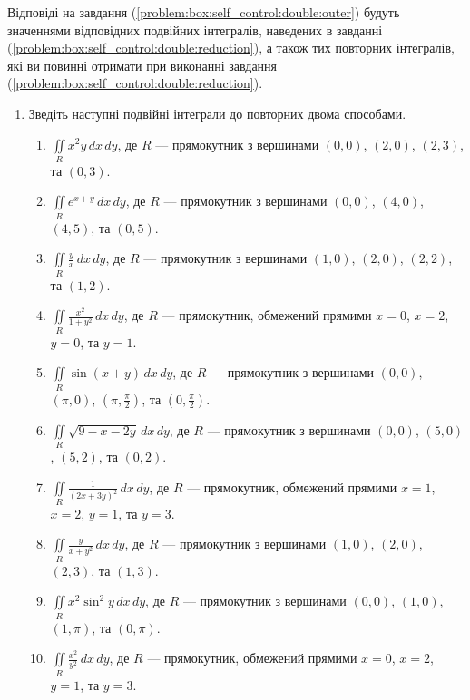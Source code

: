 Відповіді на завдання (\ref{problem:box:self_control:double:outer}) будуть значеннями відповідних подвійних інтегралів, наведених в завданні (\ref{problem:box:self_control:double:reduction}), а також тих повторних інтегралів, які ви повинні отримати при виконанні завдання (\ref{problem:box:self_control:double:reduction}).
\begin{enumerate}
\item\label{problem:box:self_control:double:reduction} Зведіть наступні подвійні інтеграли до повторних двома способами.
    \begin{enumerate}[label*=\arabic*.]
        \item $\iint\limits_R x^2y\,dx\,dy$, де $R$ --- прямокутник з вершинами $(0, 0)$, $(2, 0)$, $(2, 3)$, та $(0, 3)$.
        \item $\iint\limits_R e^{x + y}\,dx\,dy$, де $R$ --- прямокутник з вершинами $(0, 0)$, $(4, 0)$, $(4, 5)$, та $(0, 5)$.
        \item $\iint\limits_R \frac{y}{x}\,dx\,dy$, де $R$ --- прямокутник з вершинами $(1, 0)$, $(2, 0)$, $(2, 2)$, та $(1, 2)$.
        \item $\iint\limits_R \frac{x^2}{1+y^2}\,dx\,dy$, де $R$ --- прямокутник, обмежений прямими $x=0$, $x=2$, $y=0$, та $y=1$.
        \item $\iint\limits_R \sin(x + y)\,dx\,dy$, де $R$ --- прямокутник з вершинами $(0, 0)$, $(\pi, 0)$, $(\pi, \frac{\pi}{2})$, та $(0, \frac{\pi}{2})$.
        \item $\iint\limits_R \sqrt{ 9 -x - 2y}\,dx\,dy$, де $R$ --- прямокутник з вершинами $(0, 0)$, $(5, 0)$, $(5, 2)$, та $(0, 2)$.
        \item $\iint\limits_R \frac{1}{\left( 2 x + 3 y \right)^2}\,dx\,dy$, де $R$ --- прямокутник, обмежений прямими $x=1$, $x=2$, $y=1$, та $y=3$.
        \item $\iint\limits_R \frac{y}{x+y^2}\,dx\,dy$, де $R$ --- прямокутник з вершинами $(1, 0)$, $(2, 0)$, $(2, 3)$, та $(1, 3)$.
        \item $\iint\limits_R x^2\sin^2y\,dx\,dy$, де $R$ --- прямокутник з вершинами $(0, 0)$, $(1, 0)$, $(1, \pi)$, та $(0, \pi)$.
        \item $\iint\limits_R \frac{x^2}{y^2}\,dx\,dy$, де $R$ --- прямокутник, обмежений прямими $x=0$, $x=2$, $y=1$, та $y=3$.
    \end{enumerate}


\end{enumerate}

